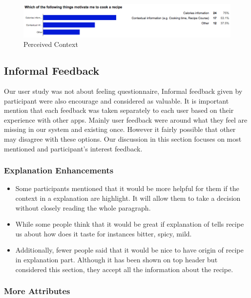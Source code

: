 \begin{figure}[h]
	\centering
	\includegraphics[width= 1\linewidth]{figures/ch5_stat_context}
	\caption{Perceived Context}
	\label{fig:ch5_stat_context}
\end{figure}

\subsection{Informal Feedback}

Our user study was not about feeling questionnaire, Informal feedback given by participant were also encourage and considered as valuable. It is important mention that each feedback was taken separately to each user based on their experience with other apps. Mainly user feedback were around what they feel are missing in our system and existing once. However it fairly possible that other may disagree with these options. Our discussion in this section focuses on most mentioned and participant’s interest feedback. \newline

\subsubsection{Explanation Enhancements}

 	\begin{itemize}
 		\item Some participants mentioned that it would be more helpful for them if the context in a explanation are highlight. It will allow them to take a decision without closely reading the whole paragraph.
 		
 		\item  While some people think that it would be great if explanation of tells recipe us about how does it taste for instances bitter, spicy, mild. 
 		
 		 \item Additionally, fewer people said that it would be nice to have origin of recipe in explanation part. Although it has been shown on top header but considered this section, they accept all the information about the recipe. 
 	\end{itemize}
 	
\subsubsection{More Attributes}

